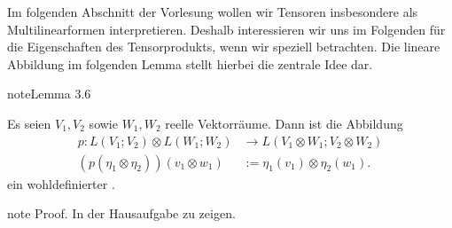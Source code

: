 \documentclass[letterpaper,10pt,english]{jupyterBook}
\begin{document}
\sphinxAtStartPar
Im folgenden Abschnitt der Vorlesung wollen wir Tensoren insbesondere als Multilinearformen interpretieren.
Deshalb interessieren wir uns im Folgenden für die Eigenschaften des Tensorprodukts, wenn wir speziell  betrachten.
Die lineare Abbildung im folgenden Lemma stellt hierbei die zentrale Idee dar.
\label{vektoranalysis/tensor:lem:LISO}
\begin{sphinxadmonition}{note}{Lemma 3.6}



\sphinxAtStartPar
Es seien \(V_1, V_2\) sowie \(W_1, W_2\) reelle Vektorräume.
Dann ist die Abbildung
\begin{equation*}
\begin{split}p:L(V_1; V_2)\otimes L(W_1; W_2) &\rightarrow L(V_1\otimes W_1; V_2\otimes W_2)\\
(p(\eta_1\otimes\eta_2))(v_1\otimes w_1)&:= \eta_1(v_1) \otimes \eta_2(w_1).\end{split}
\end{equation*}
\sphinxAtStartPar
ein wohldefinierter .
\end{sphinxadmonition}

\begin{sphinxadmonition}{note}
\sphinxAtStartPar
Proof. In der Hausaufgabe zu zeigen.
\end{sphinxadmonition}
\end{document}
